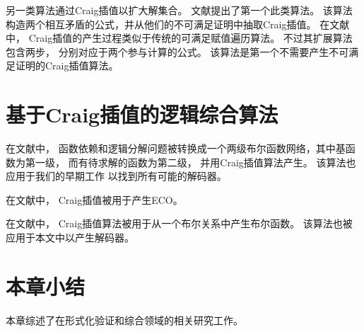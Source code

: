 另一类算法通过Craig插值以扩大解集合。
文献提出了第一个此类算法。
该算法构造两个相互矛盾的公式，并从他们的不可满足证明中抽取Craig插值。
在文献中，
Craig插值的产生过程类似于传统的可满足赋值遍历算法。
不过其扩展算法包含两步，
分别对应于两个参与计算的公式。
该算法是第一个不需要产生不可满足证明的Craig插值算法。

\section{基于Craig插值的逻辑综合算法}
在文献中，
函数依赖和逻辑分解问题被转换成一个两级布尔函数网络，其中基函数为第一级，
而有待求解的函数为第二级，
并用Craig插值算法产生。
该算法也应用于我们的早期工作 以找到所有可能的解码器。

在文献中，
Craig插值被用于产生ECO。

在文献中，
Craig插值算法被用于从一个布尔关系中产生布尔函数。
该算法也被应用于本文中以产生解码器。

\section{本章小结}
本章综述了在形式化验证和综合领域的相关研究工作。
